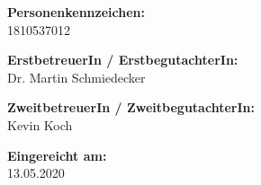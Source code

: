 \begin{center}
\hspace*{-1.0cm} \textbf{Personenkennzeichen:}\\
\vspace{0.2cm}
\hspace*{-1.0cm} 1810537012 \\

\vspace{0.7cm}

\hspace*{-1.0cm} \textbf{ErstbetreuerIn / ErstbegutachterIn:} \\
\vspace{0.2cm}
\hspace*{-1.0cm} Dr. Martin Schmiedecker \\

\vspace{0.7cm}

\hspace*{-1.0cm} \textbf{ZweitbetreuerIn / ZweitbegutachterIn:} \\
\vspace{0.2cm}
\hspace*{-1.0cm} Kevin Koch \\


\vspace{0.7cm}

\hspace*{-1.0cm} \textbf{Eingereicht am:} \\
\vspace{0.2cm}
\hspace*{-1.0cm} 13.05.2020 \\

\end{center}

\newpage

\pagestyle{empty}

\vspace*{15.6cm}


